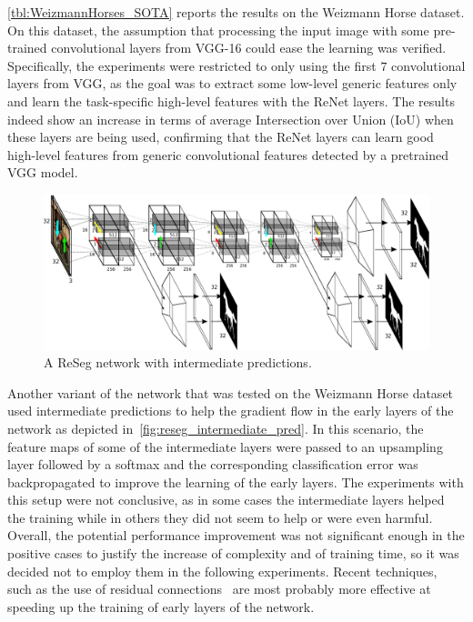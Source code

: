 \autoref{tbl:WeizmannHorses_SOTA} reports the results on the Weizmann
Horse dataset. On this dataset, the assumption that processing the input image
with some pre-trained convolutional layers from VGG-16 could ease the learning
was verified. Specifically, the experiments were restricted to only using the
first $7$ convolutional layers from VGG, as the goal was to extract some
low-level generic features only and learn the task-specific high-level features
with the ReNet layers. The results indeed show an increase in terms of average
Intersection over Union (IoU) when these layers are being used, confirming that
the ReNet layers can learn good high-level features from generic convolutional
features detected by a pretrained VGG model.

\begin{figure}[t]
    \centering
    \includegraphics[width=\textwidth]{img/reseg/reseg_interm_pred.pdf}
    \caption{A ReSeg network with intermediate predictions.}
    \label{fig:reseg_intermediate_pred}
\end{figure}

Another variant of the network that was tested on the Weizmann Horse dataset
used intermediate predictions to help the gradient flow in the early layers
of the network as depicted in~\autoref{fig:reseg_intermediate_pred}. In this
scenario, the feature maps of some of the intermediate layers were passed to an
upsampling layer followed by a softmax and the corresponding classification
error was backpropagated to improve the learning of the early layers. The
experiments with this setup were not conclusive, as in some cases the
intermediate layers helped the training while in others they did not seem to
help or were even harmful. Overall, the potential performance improvement was
not significant enough in the positive cases to justify the increase of
complexity and of training time, so it was decided not to employ them in the
following experiments. Recent techniques, such as the use of residual
connections~\citep{he2015deep,srivastava2015training} are most probably more
effective at speeding up the training of early layers of the network.

